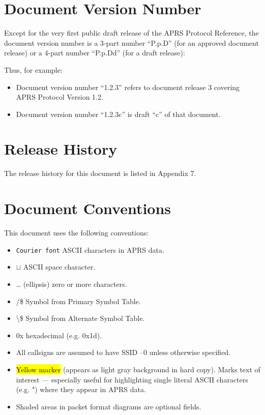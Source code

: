 \section*{Document Version Number}

Except for the very first public draft release of the APRS Protocol
Reference, the document version number is a 3-part number “P.p.D” (for
an approved document release) or a 4-part number “P.p.Dd” (for a draft
release):




Thus, for example:

\begin{itemize}

\item Document version number “1.2.3” refers to document release 3 covering
APRS Protocol Version 1.2.

\item Document version number “1.2.3c” is draft “c” of that document.

\end{itemize}


\section*{Release History}

The release history for this document is listed in Appendix 7.

\section*{Document Conventions}

This document uses the following conventions:
\begin{itemize}

\item \texttt {Courier font} ASCII characters in APRS data.

\item $\sqcup$ ASCII space character.

\item … (ellipsis) zero or more characters.

\item /\$ Symbol from Primary Symbol Table.

\item \textbackslash\$ Symbol from Alternate Symbol Table.

\item 0x hexadecimal (e.g. 0x1d).

\item All callsigns are assumed to have SSID –0 unless otherwise specified.

\item \hl{Yellow marker} (appears as light gray background in hard copy).
Marks text of interest — especially useful for highlighting single
literal ASCII characters (e.g. ") where they appear in APRS data.

\item Shaded areas in packet format diagrams are optional fields.

\end{itemize}

